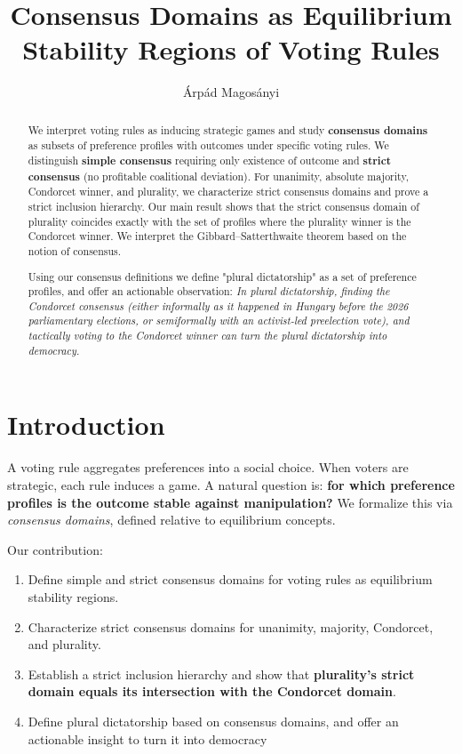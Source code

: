 \documentclass{article}
\title{Consensus Domains as Equilibrium Stability Regions of Voting Rules}
\author{Árpád Magosányi}
\date{}
\begin{document}
\maketitle

\begin{abstract}
We interpret voting rules as inducing strategic games and study \textbf{consensus domains} as subsets of preference profiles with outcomes under specific voting rules. We distinguish \textbf{simple consensus} requiring only existence of outcome and \textbf{strict consensus} (no profitable coalitional deviation). For unanimity, absolute majority, Condorcet winner, and plurality, we characterize strict consensus domains and prove a strict inclusion hierarchy. Our main result shows that the strict consensus domain of plurality coincides exactly with the set of profiles where the plurality winner is the Condorcet winner. We interpret the Gibbard–Satterthwaite theorem based on the notion of consensus.

Using our consensus definitions we define "plural dictatorship" as a set of preference profiles, and offer an actionable observation:
\emph{In plural dictatorship, finding the Condorcet consensus (either informally as it happened in Hungary before the 2026 parliamentary elections, or semiformally with an activist-led preelection vote), and tactically voting to the Condorcet winner can turn the plural dictatorship into democracy.}

\end{abstract}

\section{Introduction}
A voting rule aggregates preferences into a social choice. When voters are strategic, each rule induces a game. A natural question is: \textbf{for which preference profiles is the outcome stable against manipulation?} We formalize this via \emph{consensus domains}, defined relative to equilibrium concepts.

Our contribution:
\begin{enumerate}
    \item Define simple and strict consensus domains for voting rules as equilibrium stability regions.
    \item Characterize strict consensus domains for unanimity, majority, Condorcet, and plurality.
    \item Establish a strict inclusion hierarchy and show that \textbf{plurality’s strict domain equals its intersection with the Condorcet domain}.
    \item Define plural dictatorship based on consensus domains, and offer an actionable insight to turn it into democracy
\end{enumerate}
\end{document}

